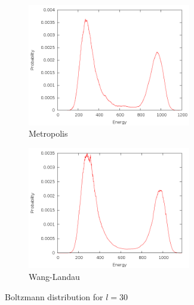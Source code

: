 \documentclass{article}
\begin{document}
\begin{figure}[H]
\begin{subfigure}[t]{2.8in}
    \includegraphics[width=2.8in]{../results/metropolis/m30.png}
    \caption{Metropolis}
    \label{fig:m30}
\end{subfigure}
\quad
\begin{subfigure}[t]{2.8in}
    \includegraphics[width=2.8in]{../results/wanglandau/b30.png}
    \caption{Wang-Landau}
    \label{fig:b30}
\end{subfigure}
\caption{Boltzmann distribution for $l = 30$}
\end{figure}
\end{document}
